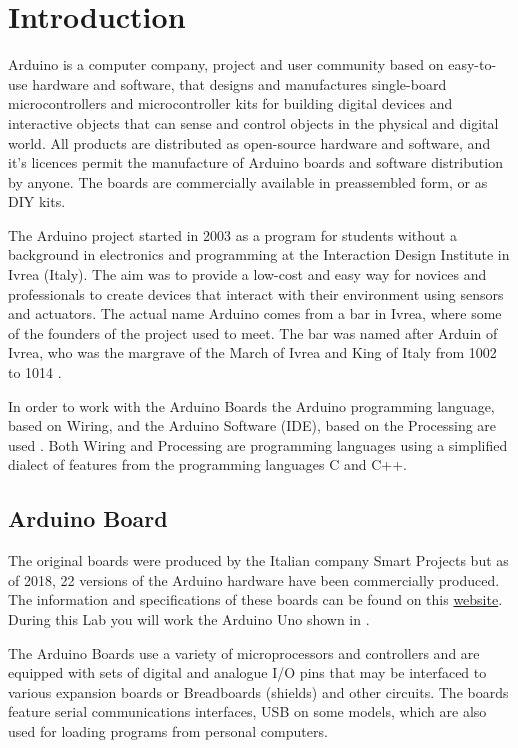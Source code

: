 \section{Introduction}
Arduino is a computer company, project and user community based on easy-to-use hardware and software, that designs and manufactures single-board microcontrollers and microcontroller kits for building digital devices and interactive objects that can sense and control objects in the physical and digital world. All products are distributed as open-source hardware and software, and it's licences permit the manufacture of Arduino boards and software distribution by anyone. The boards are commercially available in preassembled form, or as \ac{DIY} kits.\par

The Arduino project started in 2003 as a program for students without a background in electronics and programming at the Interaction Design Institute in Ivrea (Italy). The aim was to provide a low-cost and easy way for novices and professionals to create devices that interact with their environment using sensors and actuators. The actual name Arduino comes from a bar in Ivrea, where some of the founders of the project used to meet. The bar was named after Arduin of Ivrea, who was the margrave of the March of Ivrea and King of Italy from 1002 to 1014 \cite{wiki:1}. \par

In order to work with the Arduino Boards the Arduino programming language, based on Wiring, and the Arduino Software (\ac{IDE}), based on the Processing are used \cite{arduino:1}. Both Wiring and Processing are programming languages using a simplified dialect of features from the programming languages C and C++.

\subsection{Arduino Board}
The original boards were produced by the Italian company Smart Projects but as of 2018, 22 versions of the Arduino hardware have been commercially produced. The information and 
specifications of these boards can be found on this {\href{https://www.arduino.cc/en/Products/Compare}{website}}. During this Lab you will work the Arduino Uno shown in . \par 

The Arduino Boards use a variety of microprocessors and controllers and are equipped with sets of digital and analogue \ac{I/O} pins that may be interfaced to various expansion boards or Breadboards (shields) and other circuits. The boards feature serial communications interfaces, \ac{USB} on some models, which are also used for loading programs from personal computers.\par

